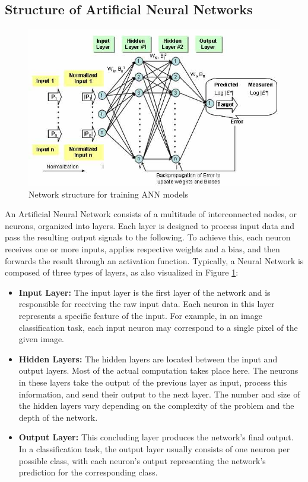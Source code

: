 \documentclass[12pt,fleqn,a4paper]{article}
\begin{document}
\subsection{Structure of Artificial Neural Networks}

\begin{figure}[H]
    \centering
    \includegraphics[width=0.56\linewidth]{graphs/annStructure.jpg}
    \caption{Network structure for training ANN models  \cite{FHWA}}
    \label{fig:annStruct}
\end{figure}

An Artificial Neural Network consists of a multitude of interconnected nodes, or neurons, organized into layers. Each layer is designed to process input data and pass the resulting output signals to the following. To achieve this, each neuron receives one or more inputs, applies respective weights and a bias, and then forwards the result through an activation function. Typically, a Neural Network is composed of three types of layers, as also visualized in Figure \ref{fig:annStruct}:

\begin{itemize}
     \item \textbf{Input Layer:} The input layer is the first layer of the network and is responsible for receiving the raw input data. Each neuron in this layer represents a specific feature of the input. For example, in an image classification task, each input neuron may correspond to a single pixel of the given image.
     \item \textbf{Hidden Layers:} The hidden layers are located between the input and output layers. Most of the actual computation takes place here. The neurons in these layers take the output of the previous layer as input, process this information, and send their output to the next layer. The number and size of the hidden layers vary depending on the complexity of the problem and the depth of the network.
     \item \textbf{Output Layer:} This concluding layer produces the network's final output. In a classification task, the output layer usually consists of one neuron per possible class, with each neuron's output representing the network's prediction for the corresponding class.
\end{itemize}
\end{document}
